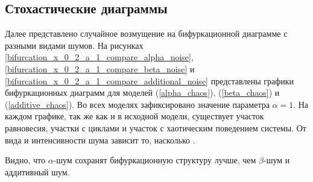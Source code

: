 \subsection{Стохастические диаграммы}

    Далее представлено случайное возмущение на бифуркационной диаграмме с разными видами шумов. На рисунках \ref{bifurcation_x_0_2_a_1_compare_alpha_noise}, \ref{bifurcation_x_0_2_a_1_compare_beta_noise} и \ref{bifurcation_x_0_2_a_1_compare_additional_noise} представлены графики бифуркационных диаграмм для моделей (\ref{alpha_chaos}), (\ref{beta_chaos}) и (\ref{additive_chaos}). Во всех моделях зафиксировано значение параметра \(\alpha = 1\). На каждом графике, так же как и в исходной модели, существует участок равновесия, участки с циклами и участок с хаотическим поведением системы. От вида и интенсивности шума зависит то, насколько .

    Видно, что \(\alpha\)-шум сохранят бифуркационную структуру лучше, чем \(\beta\)-шум и аддитивный шум.

